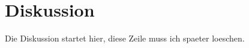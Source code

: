 \section{Diskussion}
\label{sec:Diskussion}
Die Diskussion startet hier, diese Zeile muss ich spaeter loeschen.